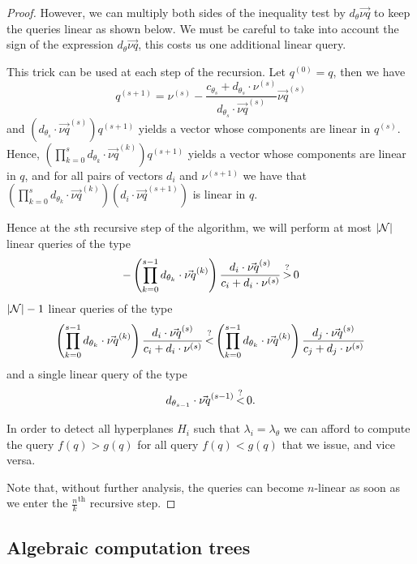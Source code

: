 \begin{proof}
However, we can multiply both sides of the inequality test by \(d_\theta
\vec{\nu q}\) to keep the queries linear as shown below. We must be careful to
take into account the sign of the expression \(d_\theta \vec{\nu q}\), this
costs us one additional linear query.

This trick can be used at each step of the recursion. Let \(q^{(0)} = q\),
then we have
$$
	q^{(s+1)} = \nu^{(s)} - \frac{c_{\theta_{s}} + d_{\theta_{s}} \cdot
	\nu^{(s)}}{d_{\theta_{s}} \cdot \vec{\nu q}^{(s)}}\vec{\nu q}^{(s)}
$$
and \( (d_{\theta_{s}}\cdot \vec{\nu q}^{(s)}) q^{(s+1)}\) yields a vector
whose components are linear in \(q^{(s)}\).
Hence,
\( (\prod_{k=0}^{s} d_{\theta_{k}} \cdot \vec{\nu q}^{(k)})
 q^{(s+1)}\) yields a vector
whose components are linear in \(q\),
and for all pairs of vectors \(d_i\) and \(\nu^{(s+1)}\)
we have that \( (\prod_{k=0}^{s} d_{\theta_{k}} \cdot \vec{\nu q}^{(k)}) (d_i
\cdot \vec{\nu q}^{(s+1)})\) is linear in \(q\).

Hence at the $s$th recursive step of the algorithm, we will perform
at most \(|{\mathcal{N}}|\) linear queries of the type
$$
	-\left(\prod_{k=0}^{s-1} d_{\theta_{k}} \cdot \vec{\nu q}^{(k)}\right)
\frac{d_i \cdot \vec{\nu q}^{(s)}}{c_i + d_i \cdot
	\nu^{(s)}} \mathop{>}^{?} 0
$$
\(|{\mathcal{N}}| - 1\) linear queries of the type
$$
	\left(\prod_{k=0}^{s-1} d_{\theta_{k}} \cdot \vec{\nu q}^{(k)}\right)
	\frac{d_i \cdot \vec{\nu q}^{(s)}}{c_i + d_i \cdot \nu^{(s)}}
\mathop{<}^{?}
\left(\prod_{k=0}^{s-1} d_{\theta_{k}} \cdot \vec{\nu q}^{(k)}\right)
\frac{d_j \cdot \vec{\nu q}^{(s)}}{c_j + d_j \cdot \nu^{(s)}}
$$
and a single linear query of the type
$$
	d_{\theta_{s-1}} \cdot \vec{\nu q}^{(s-1)} \mathop{<}^{?} 0.
$$

In order to detect all hyperplanes \(H_i\) such that \(\lambda_i =
\lambda_\theta\) we can afford to compute the query $f(q) > g(q)$ for all query
$f(q) < g(q)$ that we issue, and vice versa.

Note that, without further analysis, the queries can become \(n\)-linear as
soon as we enter the \(\frac{n}{k}^{\text{th}}\) recursive step.
\end{proof}

\subsection{Algebraic computation trees}
\label{app:act}

